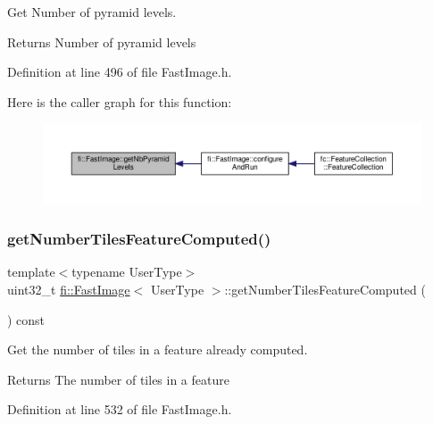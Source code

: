 Get Number of pyramid levels. 

\begin{DoxyReturn}{Returns}
Number of pyramid levels 
\end{DoxyReturn}


Definition at line 496 of file Fast\+Image.\+h.

Here is the caller graph for this function\+:
\nopagebreak
\begin{figure}[H]
\begin{center}
\leavevmode
\includegraphics[width=350pt]{dc/d6b/classfi_1_1FastImage_aaa3d1fe92e83a2e1568a7b66ecfd2d2a_icgraph}
\end{center}
\end{figure}
\mbox{\label{classfi_1_1FastImage_adc03852a5c3ecabab795cd13034c3d9e}} 
\subsubsection{\texorpdfstring{get\+Number\+Tiles\+Feature\+Computed()}{getNumberTilesFeatureComputed()}}
{\footnotesize\ttfamily template$<$typename User\+Type$>$ \\
uint32\+\_\+t \hyperlink{classfi_1_1FastImage}{fi\+::\+Fast\+Image}$<$ User\+Type $>$\+::get\+Number\+Tiles\+Feature\+Computed (\begin{DoxyParamCaption}{ }\end{DoxyParamCaption}) const\hspace{0.3cm}{\ttfamily [inline]}}



Get the number of tiles in a feature already computed. 

\begin{DoxyReturn}{Returns}
The number of tiles in a feature 
\end{DoxyReturn}


Definition at line 532 of file Fast\+Image.\+h.

